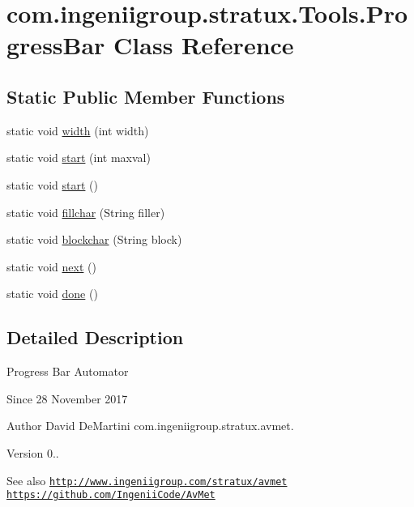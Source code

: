 \hypertarget{classcom_1_1ingeniigroup_1_1stratux_1_1_tools_1_1_progress_bar}{}\section{com.\+ingeniigroup.\+stratux.\+Tools.\+Progress\+Bar Class Reference}
\label{classcom_1_1ingeniigroup_1_1stratux_1_1_tools_1_1_progress_bar}
\subsection*{Static Public Member Functions}
\begin{DoxyCompactItemize}
\item 
static void \hyperlink{classcom_1_1ingeniigroup_1_1stratux_1_1_tools_1_1_progress_bar_a4c798b88928e52d69eeb44364f304b4c}{width} (int width)
\item 
static void \hyperlink{classcom_1_1ingeniigroup_1_1stratux_1_1_tools_1_1_progress_bar_ab4342d95c7c54271701a3f5c43d93800}{start} (int maxval)
\item 
static void \hyperlink{classcom_1_1ingeniigroup_1_1stratux_1_1_tools_1_1_progress_bar_a71e2b7da230b6896fb2b341167658200}{start} ()
\item 
static void \hyperlink{classcom_1_1ingeniigroup_1_1stratux_1_1_tools_1_1_progress_bar_a1c2189455ef97736a823ef0a71de0c73}{fillchar} (String filler)
\item 
static void \hyperlink{classcom_1_1ingeniigroup_1_1stratux_1_1_tools_1_1_progress_bar_a56df507f772342b6214b12f7adf5d8ce}{blockchar} (String block)
\item 
static void \hyperlink{classcom_1_1ingeniigroup_1_1stratux_1_1_tools_1_1_progress_bar_a9dd927bd6d40931d70d45aa98e51c73b}{next} ()
\item 
static void \hyperlink{classcom_1_1ingeniigroup_1_1stratux_1_1_tools_1_1_progress_bar_acf3adf97120d7eeb7e20f21f219f920a}{done} ()
\end{DoxyCompactItemize}


\subsection{Detailed Description}
Progress Bar Automator

\begin{DoxySince}{Since}
28 November 2017 
\end{DoxySince}
\begin{DoxyAuthor}{Author}
David De\+Martini  com.\+ingeniigroup.\+stratux.\+avmet. 
\end{DoxyAuthor}
\begin{DoxyVersion}{Version}
0.. 
\end{DoxyVersion}
\begin{DoxySeeAlso}{See also}
\href{http://www.ingeniigroup.com/stratux/avmet}{\tt http\+://www.\+ingeniigroup.\+com/stratux/avmet}  \href{https://github.com/IngeniiCode/AvMet}{\tt https\+://github.\+com/\+Ingenii\+Code/\+Av\+Met} 
\end{DoxySeeAlso}


